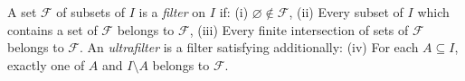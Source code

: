 A set $\mathcal{F}$ of subsets of $I$ is a \emph{filter} on $I$ if:
(i) $\varnothing \notin \mathcal{F}$,
(ii) Every subset of $I$ which contains a set of $\mathcal{F}$ belongs to $\mathcal{F}$,
(iii) Every finite intersection of sets of $\mathcal{F}$ belongs to $\mathcal{F}$.
An \emph{ultrafilter} is a filter satisfying additionally:
(iv) For each $A \subseteq I$, exactly one of $A$ and $I \setminus A$ belongs to $\mathcal{F}$.
